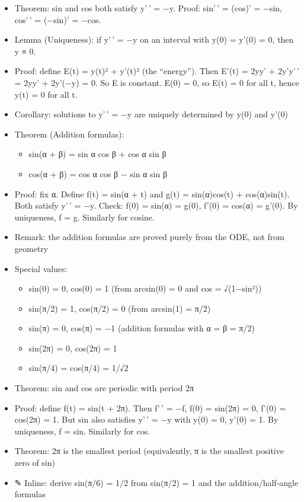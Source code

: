 \documentclass[
  10pt,
  letterpaper,
]{scrbook}
\providecommand{\tightlist}{%
  \setlength{\itemsep}{0pt}\setlength{\parskip}{0pt}}
\begin{document}
\begin{itemize}
\tightlist
\item
  Theorem: sin and cos both satisfy y'\,' = −y. Proof: sin'\,' = (cos)'
  = −sin, cos'\,' = (−sin)' = −cos.
\item
  Lemma (Uniqueness): if y'\,' = −y on an interval with y(0) = y'(0) =
  0, then y ≡ 0.
\item
  Proof: define E(t) = y(t)² + y'(t)² (the ``energy''). Then E'(t) =
  2yy' + 2y'y'\,' = 2yy' + 2y'(−y) = 0. So E is constant. E(0) = 0, so
  E(t) = 0 for all t, hence y(t) = 0 for all t.
\item
  Corollary: solutions to y'\,' = −y are uniquely determined by y(0) and
  y'(0)
\item
  Theorem (Addition formulas):

  \begin{itemize}
  \tightlist
  \item
    sin(α + β) = sin α cos β + cos α sin β
  \item
    cos(α + β) = cos α cos β − sin α sin β
  \end{itemize}
\item
  Proof: fix α. Define f(t) = sin(α + t) and g(t) = sin(α)cos(t) +
  cos(α)sin(t). Both satisfy y'\,' = −y. Check: f(0) = sin(α) = g(0),
  f'(0) = cos(α) = g'(0). By uniqueness, f = g. Similarly for cosine.
\item
  Remark: the addition formulas are proved purely from the ODE, not from
  geometry
\item
  Special values:

  \begin{itemize}
  \tightlist
  \item
    sin(0) = 0, cos(0) = 1 (from arcsin(0) = 0 and cos = √(1−sin²))
  \item
    sin(π/2) = 1, cos(π/2) = 0 (from arcsin(1) = π/2)
  \item
    sin(π) = 0, cos(π) = −1 (addition formulas with α = β = π/2)
  \item
    sin(2π) = 0, cos(2π) = 1
  \item
    sin(π/4) = cos(π/4) = 1/√2
  \end{itemize}
\item
  Theorem: sin and cos are periodic with period 2π
\item
  Proof: define f(t) = sin(t + 2π). Then f'\,' = −f, f(0) = sin(2π) = 0,
  f'(0) = cos(2π) = 1. But sin also satisfies y'\,' = −y with y(0) = 0,
  y'(0) = 1. By uniqueness, f = sin. Similarly for cos.
\item
  Theorem: 2π is the smallest period (equivalently, π is the smallest
  positive zero of sin)
\item
  ✎ Inline: derive sin(π/6) = 1/2 from sin(π/2) = 1 and the
  addition/half-angle formulas
\end{itemize}
\end{document}
